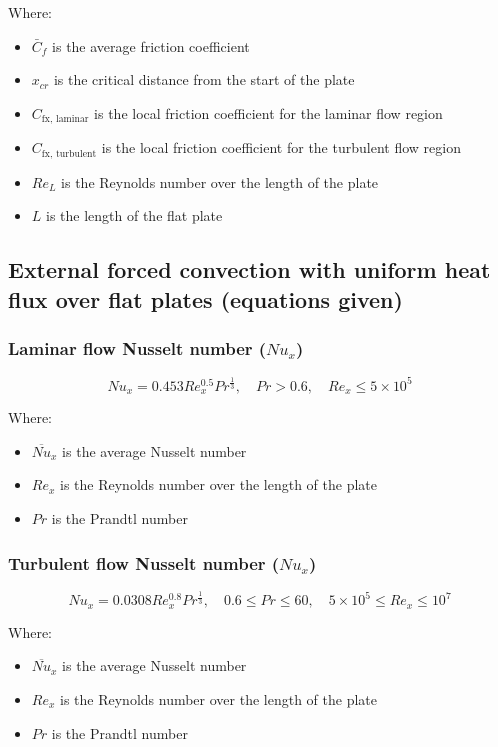 \documentclass[11pt]{article}
\begin{document}
Where:
\begin{itemize}
\item \(\bar{C}_f\) is the average friction coefficient
\item \(x_{cr}\) is the critical distance from the start of the plate
\item \(C_{\text{fx, laminar}}\) is the local friction coefficient for the laminar flow region
\item \(C_{\text{fx, turbulent}}\) is the local friction coefficient for the turbulent flow region
\item \(Re_L\) is the Reynolds number over the length of the plate
\item \(L\) is the length of the flat plate
\end{itemize}

\subsection{External forced convection with uniform heat flux over flat plates (equations given)}
\label{sec:orgb5d231a}

\subsubsection{Laminar flow Nusselt number (\(Nu_x\))}
\label{sec:org08c8cb9}
\[Nu_x = 0.453 Re_x^{0.5} Pr^{\frac{1}{3}}, \quad Pr > 0.6, \quad Re_x \le 5 \times 10^5\]

Where:
\begin{itemize}
\item \(\overline{Nu}_x\) is the average Nusselt number
\item \(Re_x\) is the Reynolds number over the length of the plate
\item \(Pr\) is the Prandtl number
\end{itemize}

\subsubsection{Turbulent flow Nusselt number (\(Nu_x\))}
\label{sec:org48dd26f}
\[Nu_x = 0.0308 Re_x^{0.8} Pr^{\frac{1}{3}}, \quad 0.6 \le Pr \le 60, \quad 5 \times 10^5 \le Re_x \le 10^7\]

Where:
\begin{itemize}
\item \(\overline{Nu}_x\) is the average Nusselt number
\item \(Re_x\) is the Reynolds number over the length of the plate
\item \(Pr\) is the Prandtl number
\end{itemize}
\end{document}
